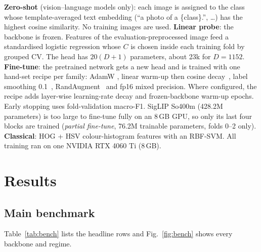 \documentclass[conference]{IEEEtran}
\begin{document}
\textbf{Zero-shot} (vision--language models only): each image is assigned to the class whose template-averaged text
embedding (``a photo of a \{class\}.'', \dots) has the highest cosine similarity. No training images are used.
\textbf{Linear probe}: the backbone is frozen. Features of the evaluation-preprocessed image feed a standardised
logistic regression whose $C$ is chosen inside each training fold by grouped CV. The head has $20(D+1)$ parameters,
about 23k for $D=1152$.
\textbf{Fine-tune}: the pretrained network gets a new head and is trained with one hand-set recipe per family: AdamW
\cite{loshchilov2019adamw}, linear warm-up then cosine decay~\cite{loshchilov2017sgdr}, label smoothing
0.1~\cite{szegedy2016inception}, RandAugment~\cite{cubuk2020randaugment} and fp16 mixed precision. Where configured,
the recipe adds layer-wise learning-rate decay and frozen-backbone warm-up epochs. Early stopping uses fold-validation
macro-F1. SigLIP So400m (428.2M parameters) is too large to fine-tune fully on an 8\,GB GPU, so only its last four
blocks are trained (\emph{partial fine-tune}, 76.2M trainable parameters, folds 0--2 only).
\textbf{Classical}: HOG + HSV colour-histogram features with an RBF-SVM.
All training ran on one NVIDIA RTX 4060 Ti (8\,GB).

\section{Results}\label{sec:results}
\subsection{Main benchmark}
Table~\ref{tab:bench} lists the headline rows and Fig.~\ref{fig:bench} shows every backbone and regime.
\end{document}
